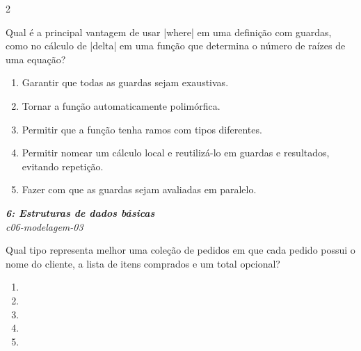 \documentclass[a4paper,10pt,brazil]{article}
\begin{document}
\begin{multicols}{2}
\begin{flushright}
\end{flushright}
Qual é a principal vantagem de usar \haskellinline|where| em uma definição com guardas, como no cálculo de \haskellinline|delta| em uma função que determina o número de raízes de uma equação?

\begin{enumerate}
  \item Garantir que todas as guardas sejam exaustivas.

  \item Tornar a função automaticamente polimórfica.

  \item Permitir que a função tenha ramos com tipos diferentes.

  \item Permitir nomear um cálculo local e reutilizá-lo em guardas e resultados, evitando repetição.

  \item Fazer com que as guardas sejam avaliadas em paralelo.


\end{enumerate}

\begin{flushright}
  \footnotesize
  \textit{\textbf{6: Estruturas de dados básicas}}\\
  \textit{c06-modelagem-03}\\

\end{flushright}
Qual tipo representa melhor uma coleção de pedidos em que cada pedido possui o nome do cliente, a lista de itens comprados e um total opcional?

\begin{enumerate}
  \item {}

  \item {}

  \item \haskellinline{([String], [Int], [Double])}

  \item {}

  \item {}


\end{enumerate}


\end{multicols}
\end{document}
